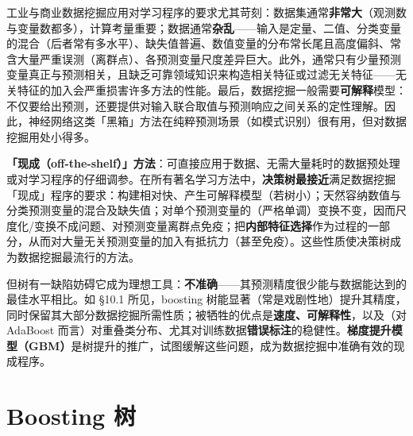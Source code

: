 工业与商业数据挖掘应用对学习程序的要求尤其苛刻：数据集通常\textbf{非常大}（观测数与变量数都多），计算考量重要；数据通常\textbf{杂乱}——输入是定量、二值、分类变量的混合（后者常有多水平）、缺失值普遍、数值变量的分布常长尾且高度偏斜、常含大量严重误测（离群点）、各预测变量尺度差异巨大。此外，通常只有少量预测变量真正与预测相关，且缺乏可靠领域知识来构造相关特征或过滤无关特征——无关特征的加入会严重损害许多方法的性能。最后，数据挖掘一般需要\textbf{可解释}模型：不仅要给出预测，还要提供对输入联合取值与预测响应之间关系的定性理解。因此，神经网络这类「黑箱」方法在纯粹预测场景（如模式识别）很有用，但对数据挖掘用处小得多。

\textbf{「现成（off-the-shelf）」方法}：可直接应用于数据、无需大量耗时的数据预处理或对学习程序的仔细调参。在所有著名学习方法中，\textbf{决策树最接近}满足数据挖掘「现成」程序的要求：构建相对快、产生可解释模型（若树小）；天然容纳数值与分类预测变量的混合及缺失值；对单个预测变量的（严格单调）变换不变，因而尺度化/变换不成问题、对预测变量离群点免疫；把\textbf{内部特征选择}作为过程的一部分，从而对大量无关预测变量的加入有抵抗力（甚至免疫）。这些性质使决策树成为数据挖掘最流行的方法。

但树有一缺陷妨碍它成为理想工具：\textbf{不准确}——其预测精度很少能与数据能达到的最佳水平相比。如 §10.1 所见，boosting 树能显著（常是戏剧性地）提升其精度，同时保留其大部分数据挖掘所需性质；被牺牲的优点是\textbf{速度、可解释性}，以及（对 AdaBoost 而言）对重叠类分布、尤其对训练数据\textbf{错误标注}的稳健性。\textbf{梯度提升模型（GBM）}是树提升的推广，试图缓解这些问题，成为数据挖掘中准确有效的现成程序。


\section{Boosting 树}

